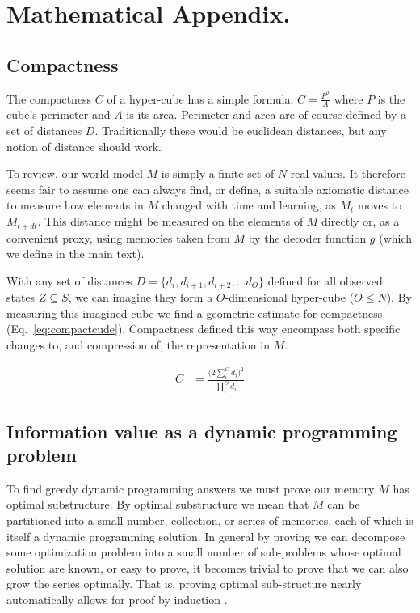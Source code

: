 \section*{Mathematical Appendix.}
\subsection*{Compactness} The compactness $C$ of a hyper-cube has a simple formula, $C = \frac{P^2}{A}$ where $P$ is the cube's perimeter and $A$ is its area. Perimeter and area are of course defined by a set of distances $D$. Traditionally these would be euclidean distances, but any notion of distance should work. 

To review, our world model $M$ is simply a finite set of $N$ real values. It therefore seems fair to assume one can always find, or define, a suitable axiomatic distance to measure how elements in $M$ changed with time and learning, as $M_{t}$ moves to $M_{t+dt}$. This distance might be measured on the elements of $M$ directly or, as a convenient proxy, using memories taken from $M$ by the decoder function $g$ (which we define in the main text). 

With any set of distances $D = \{d_i, d_{i+1}, d_{i+2},\ldots d_{O}\}$ defined for all observed states $Z \subseteq S$, we can imagine they form a $O$-dimensional hyper-cube ($O \leq N$). By measuring this imagined cube we find a geometric estimate for compactness (Eq.~\ref{eq:compactcude}). Compactness defined this way encompass both specific changes to, and compression of, the representation in $M$. 

\begin{equation}\label{eq:compactcude} 
	\begin{split}
		C & = \frac{\Big ( 2 \sum^{O}_{i} d_i \Big )^2}{\prod^{O}_{i} d_i} 
	\end{split}
\end{equation}

\subsection*{Information value as a dynamic programming problem} To find greedy dynamic programming \cite{Roughgarden2019,Sutton2018} answers we must prove our memory $M$ has optimal substructure. By optimal substructure we mean that $M$ can be partitioned into a small number, collection, or series of memories, each of which is itself a dynamic programming solution. In general by proving we can decompose some optimization problem into a small number of sub-problems whose optimal solution are known, or easy to prove, it becomes trivial to prove that we can also grow the series optimally. That is, proving optimal sub-structure nearly automatically allows for proof by induction \cite{Roughgarden2019}. 

